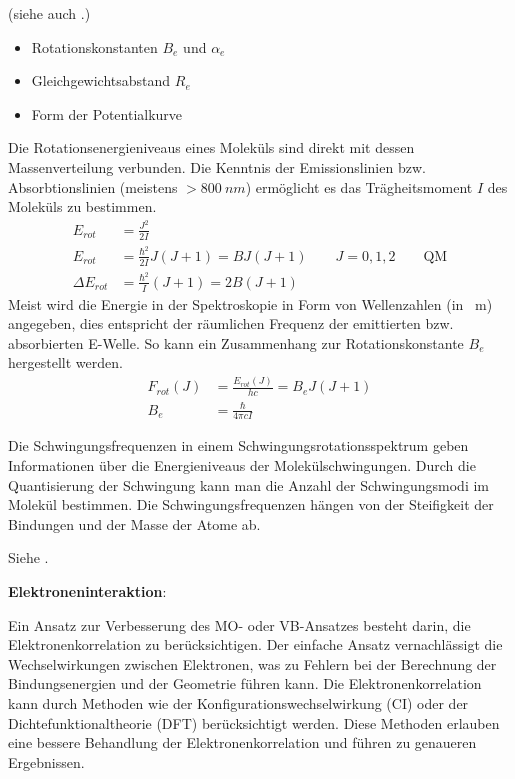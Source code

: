 \label{q:22}

(siehe auch .)

\begin{itemize}
    \item Rotationskonstanten $B_e$ und $\alpha_e$ 
    \item Gleichgewichtsabstand $R_e$
    \item Form der Potentialkurve
\end{itemize}
Die Rotationsenergieniveaus eines Moleküls sind direkt mit dessen Massenverteilung verbunden.
Die Kenntnis der Emissionslinien bzw. Absorbtionslinien (meistens $>\SI{800}{nm}$) ermöglicht es das Trägheitsmoment $I$ des Moleküls zu bestimmen.
\begin{align}
    E_{rot} &= \frac{J^2}{2I} \\
    E_{rot} &= \frac{\hbar^2}{2I}J(J+1) = BJ(J+1) \qquad J = 0,1,2 \qquad \text{QM} \\
    \Delta E_{rot} &= \frac{\hbar^2}{I}(J+1) = 2B(J+1)
\end{align}
Meist wird die Energie in der Spektroskopie in Form von Wellenzahlen (in \si{\per\meter}) angegeben, dies entspricht der räumlichen Frequenz der emittierten bzw. absorbierten E-Welle.
So kann ein Zusammenhang zur Rotationskonstante $B_e$ hergestellt werden.
\begin{align}
    F_{rot}(J) &= \frac{E_{rot}(J)}{h c} = B_e J(J+1) \\
    B_e &= \frac{\hbar}{4 \pi c I}
\end{align}

Die Schwingungsfrequenzen in einem Schwingungsrotationsspektrum geben Informationen über die Energieniveaus der Molekülschwingungen. 
Durch die Quantisierung der Schwingung kann man die Anzahl der Schwingungsmodi im Molekül bestimmen.
Die Schwingungsfrequenzen hängen von der Steifigkeit der Bindungen und der Masse der Atome ab.


\label{q:23}

Siehe .

\label{q:24}

\textbf{Elektroneninteraktion}:

Ein Ansatz zur Verbesserung des MO- oder VB-Ansatzes besteht darin, die Elektronenkorrelation zu berücksichtigen. 
Der einfache Ansatz vernachlässigt die Wechselwirkungen zwischen Elektronen, was zu Fehlern bei der Berechnung der Bindungsenergien und der Geometrie führen kann. 
Die Elektronenkorrelation kann durch Methoden wie der Konfigurationswechselwirkung (CI) oder der Dichtefunktionaltheorie (DFT) berücksichtigt werden. 
Diese Methoden erlauben eine bessere Behandlung der Elektronenkorrelation und führen zu genaueren Ergebnissen.

